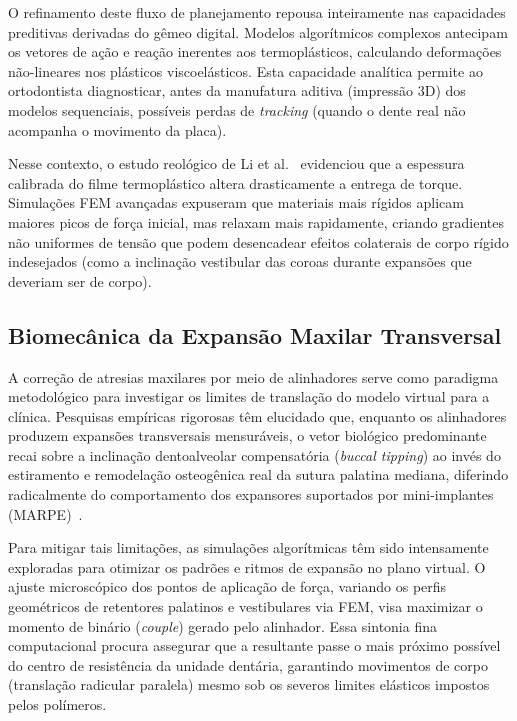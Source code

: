 O refinamento deste fluxo de planejamento repousa inteiramente nas capacidades preditivas derivadas do gêmeo digital. Modelos algorítmicos complexos antecipam os vetores de ação e reação inerentes aos termoplásticos, calculando deformações não-lineares nos plásticos viscoelásticos. Esta capacidade analítica permite ao ortodontista diagnosticar, antes da manufatura aditiva (impressão 3D) dos modelos sequenciais, possíveis perdas de \textit{tracking} (quando o dente real não acompanha o movimento da placa). 

Nesse contexto, o estudo reológico de Li et al.~\cite{li2024aligner} evidenciou que a espessura calibrada do filme termoplástico altera drasticamente a entrega de torque. Simulações FEM avançadas expuseram que materiais mais rígidos aplicam maiores picos de força inicial, mas relaxam mais rapidamente, criando gradientes não uniformes de tensão que podem desencadear efeitos colaterais de corpo rígido indesejados (como a inclinação vestibular das coroas durante expansões que deveriam ser de corpo). 

\subsection{Biomecânica da Expansão Maxilar Transversal}

A correção de atresias maxilares por meio de alinhadores serve como paradigma metodológico para investigar os limites de translação do modelo virtual para a clínica. Pesquisas empíricas rigorosas têm elucidado que, enquanto os alinhadores produzem expansões transversais mensuráveis, o vetor biológico predominante recai sobre a inclinação dentoalveolar compensatória (\textit{buccal tipping}) ao invés do estiramento e remodelação osteogênica real da sutura palatina mediana, diferindo radicalmente do comportamento dos expansores suportados por mini-implantes (MARPE)~\cite{li2024aligner}.

Para mitigar tais limitações, as simulações algorítmicas têm sido intensamente exploradas para otimizar os padrões e ritmos de expansão no plano virtual. O ajuste microscópico dos pontos de aplicação de força, variando os perfis geométricos de retentores palatinos e vestibulares via FEM, visa maximizar o momento de binário (\textit{couple}) gerado pelo alinhador. Essa sintonia fina computacional procura assegurar que a resultante passe o mais próximo possível do centro de resistência da unidade dentária, garantindo movimentos de corpo (translação radicular paralela) mesmo sob os severos limites elásticos impostos pelos polímeros.

